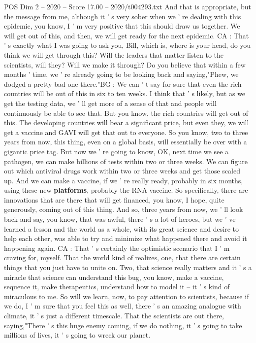 \begin{textsample}{POS Dim 2 – 2020 – Score 17.00 – 2020/t004293.txt}
And that is appropriate, but the message from me, although it ' s very sober when we ' re dealing with this epidemic, you know, I ' m very positive that this should draw us together.
We will get out of this, and then, we will get ready for the next epidemic.
CA : That ' s exactly what I was going to ask you, Bill, which is, where is your head, do you think we will get through this?
Will the leaders that matter listen to the scientists, will they?
Will we make it through?
Do you believe that within a few months ' time, we ' re already going to be looking back and saying,"Phew, we dodged a pretty bad one there."BG : We can ' t say for sure that even the rich countries will be out of this in six to ten weeks.
I think that ' s likely, but as we get the testing data, we ' ll get more of a sense of that and people will continuously be able to see that.
But you know, the rich countries will get out of this.
The developing countries will bear a significant price, but even they, we will get a vaccine and GAVI will get that out to everyone.
So you know, two to three years from now, this thing, even on a global basis, will essentially be over with a gigantic price tag.
But now we ' re going to know, OK, next time we see a pathogen, we can make billions of tests within two or three weeks.
We can figure out which antiviral drugs work within two or three weeks and get those scaled up.
And we can make a vaccine, if we ' re really ready, probably in six months, using these new \textbf{platforms}, probably the RNA vaccine.
So specifically, there are innovations that are there that will get financed, you know, I hope, quite generously, coming out of this thing.
And so, three years from now, we ' ll look back and say, you know, that was awful, there ' s a lot of heroes, but we ' ve learned a lesson and the world as a whole, with its great science and desire to help each other, was able to try and minimize what happened there and avoid it happening again.
CA : That ' s certainly the optimistic scenario that I ' m craving for, myself.
That the world kind of realizes, one, that there are certain things that you just have to unite on.
Two, that science really matters and it ' s a miracle that science can understand this bug, you know, make a vaccine, sequence it, make therapeutics, understand how to model it -- it ' s kind of miraculous to me.
So will we learn, now, to pay attention to scientists, because if we do, I ' m sure that you feel this as well, there ' s an amazing analogue with climate, it ' s just a different timescale.
That the scientists are out there, saying,"There ' s this huge enemy coming, if we do nothing, it ' s going to take millions of lives, it ' s going to wreck our planet.

\end{textsample}
